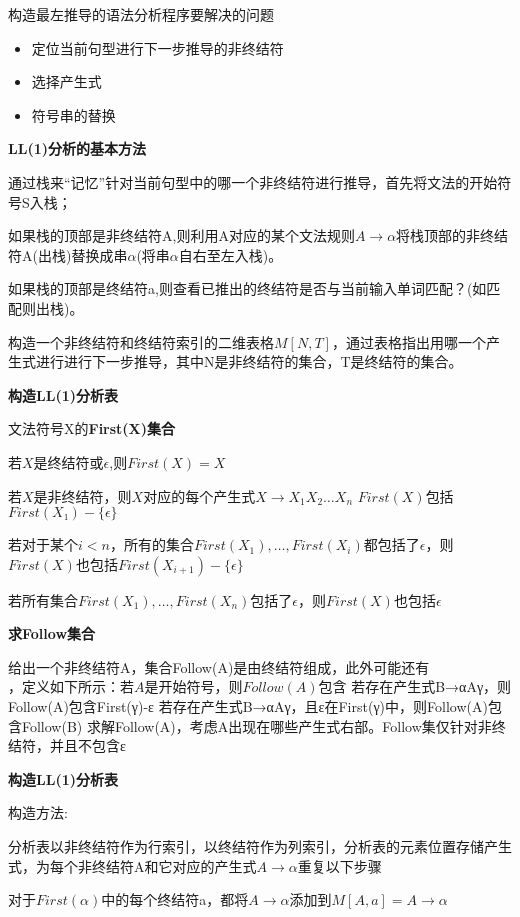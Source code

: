 \documentclass[utf8]{ctexart}
\begin{document}
\noindent 构造最左推导的语法分析程序要解决的问题
\begin{itemize}
    \item 定位当前句型进行下一步推导的非终结符
    \item 选择产生式
    \item 符号串的替换
\end{itemize}

\noindent\textbf{LL(1)分析的基本方法}

通过栈来“记忆”针对当前句型中的哪一个非终结符进行推导，首先将文法的开始符号S入栈；

如果栈的顶部是非终结符A,则利用A对应的某个文法规则$A \rightarrow \alpha$将栈顶部的非终结符A(出栈)替换成串$\alpha$(将串$\alpha$自右至左入栈)。

如果栈的顶部是终结符a,则查看已推出的终结符是否与当前输入单词匹配？(如匹配则出栈)。

构造一个非终结符和终结符索引的二维表格$M[N,T]$，通过表格指出用哪一个产生式进行进行下一步推导，其中N是非终结符的集合，T是终结符的集合。

\noindent\textbf{构造LL(1)分析表}


文法符号X的\textbf{First(X)集合}

若$X$是终结符或$\epsilon$,则$First(X)={X}$

若$X$是非终结符，则$X$对应的每个产生式$X \rightarrow X_1X_2 \dots X_n$
$First(X)$包括$First(X₁)-\{\epsilon\}$

若对于某个$i<n$，所有的集合$First(X_1),\dots,First(X_i)$都包括了$\epsilon$，则$First(X)$也包括$First(X_{i+1})-\{\epsilon\}$

若所有集合$First(X_1),\dots,First(X_n)$包括了$\epsilon$，则$First(X)$也包括$\epsilon$

\noindent\textbf{求Follow集合}

给出一个非终结符A，集合Follow(A)是由终结符组成，此外可能还有$，定义如下所示：
若A是开始符号，则Follow(A)包含$
若存在产生式B→αAγ，则Follow(A)包含First(γ)-{ε}
若存在产生式B→αAγ，且ε在First(γ)中，则Follow(A)包含Follow(B)
求解Follow(A)，考虑A出现在哪些产生式右部。Follow集仅针对非终结符，并且不包含ε

\noindent\textbf{构造LL(1)分析表}

\noindent 构造方法:

分析表以非终结符作为行索引，以终结符作为列索引，分析表的元素位置存储产生式，为每个非终结符A和它对应的产生式$A \rightarrow \alpha$重复以下步骤

对于$First(\alpha)$中的每个终结符a，都将$A \rightarrow \alpha$添加到$M[A,a]=A \rightarrow \alpha$
\end{document}

